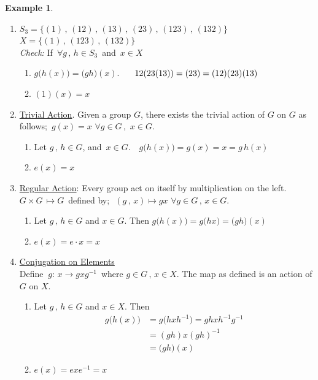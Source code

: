 \documentclass[11pt,a4paper]{article}
\theoremstyle{definition}
\newtheorem{exa}[thm]{Example}
\begin{document}
\begin{exa}
\begin{enumerate}
\item $S_3 = \{(1)\,, \, (12)\, , \, (13)\, ,\, (23)\, , \, (123)\, ,\, (132)\}$\\
$X = \{(1)\, , \, (123)\, , \, (132)\}$\\

\textit{Check:} If $\, \forall g\, , \, h\in S_3\,$ and $\, x\in X$
\begin{enumerate}
      \item[(i)] $g\big(h(x)\big) = \big(gh\big)(x).$  $\hspace{0.5cm} 12(23(13)) = (23) = (12)(23)(13)$
      \item[(ii)] $(1)(x) = x$\\
\end{enumerate}


\item \underline{Trivial Action}. Given a group $G$, there exists the trivial action of $G$ on $G$ as follows; $\, g(x) = x\,\, \forall g\in G\, , \,\, x\in G$.
\begin{enumerate}
     \item[(i)] Let $g\, , \, h\in G$, and $\, x\in G$. $\, \,\,\, g\big(h(x)\big) = g(x) = x  = g\, h(x)$
     \item[(ii)] $e(x) = x$\\
\end{enumerate}


\item \underline{Regular Action}: Every group act on itself by multiplication on the left. $G\times G\, \longmapsto G\,$ defined by; $\, \, (g\, , \,x) \longmapsto gx\,\, \forall g\in G\, , \, x\in G$.
\begin{enumerate}
    \item[(i)] Let $g\, , \, h\in G$ and $x\in G$. Then $g\big(h(x)\big) = g\big(hx\big) = \big(gh\big)(x)$
    \item[(ii)] $e(x) = e\cdot x = x$\\
\end{enumerate}


\item \underline{Conjugation on Elements}\\
Define $\ g:\, x\longrightarrow gxg^{-1}\,$ where $g\in G\, ,\, x\in X$. The map as defined is an action of $G$ on $X$.
\begin{enumerate}
      \item[(i)] Let $g\, ,\, h\in G$ and $x\in X$. Then 
      \begin{align*}
      g\big(h(x)\big) & = g\big(hxh^{-1}\big) = ghxh^{-1}g^{-1}\\
                      & = (gh)x(gh)^{-1}\\
                      & = \big(gh\big)(x)
      \end{align*}
      \item[(ii)] $e(x) = e x e^{-1} = x$\\
\end{enumerate}



\end{enumerate}
\end{exa}
\end{document}
